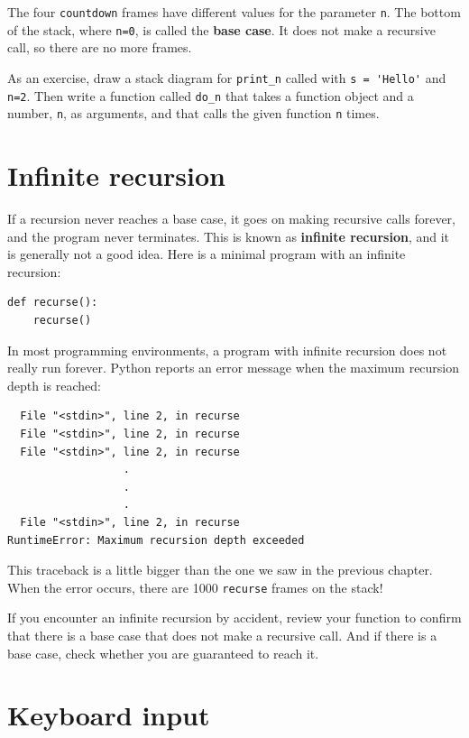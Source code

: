 \documentclass[10pt]{book}
\begin{document}
The four {\tt countdown} frames have different values for the
parameter {\tt n}.  The bottom of the stack, where {\tt n=0}, is
called the {\bf base case}.  It does not make a recursive call, so
there are no more frames.

As an exercise, draw a stack diagram for \verb"print_n" called with
\verb"s = 'Hello'" and {\tt n=2}.
Then write a function called \verb"do_n" that takes a function
object and a number, {\tt n}, as arguments, and that calls
the given function {\tt n} times.


\section{Infinite recursion}

If a recursion never reaches a base case, it goes on making
recursive calls forever, and the program never terminates.  This is
known as {\bf infinite recursion}, and it is generally not
a good idea.  Here is a minimal program with an infinite recursion:

\begin{verbatim}
def recurse():
    recurse()
\end{verbatim}
%
In most programming environments, a program with infinite recursion
does not really run forever.  Python reports an error
message when the maximum recursion depth is reached:

\begin{verbatim}
  File "<stdin>", line 2, in recurse
  File "<stdin>", line 2, in recurse
  File "<stdin>", line 2, in recurse
                  .
                  .
                  .
  File "<stdin>", line 2, in recurse
RuntimeError: Maximum recursion depth exceeded
\end{verbatim}
%
This traceback is a little bigger than the one we saw in the
previous chapter.  When the error occurs, there are 1000
{\tt recurse} frames on the stack!

If you encounter an infinite recursion by accident, review
your function to confirm that there is a base case that does not
make a recursive call.  And if there is a base case, check whether
you are guaranteed to reach it.


\section{Keyboard input}
\end{document}
